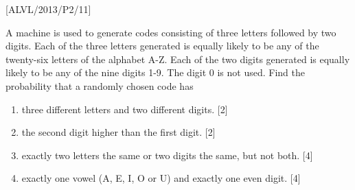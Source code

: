 \item {[}ALVL/2013/P2/11{]}

A machine is used to generate codes consisting of three letters followed
by two digits. Each of the three letters generated is equally likely
to be any of the twenty-six letters of the alphabet A-Z. Each of the
two digits generated is equally likely to be any of the nine digits
1-9. The digit 0 is not used. Find the probability that a randomly
chosen code has 
\begin{enumerate}
\item three different letters and two different digits. \hfill{}{[}2{]}
\item the second digit higher than the first digit. \hfill{}{[}2{]}
\item exactly two letters the same or two digits the same, but not both.
\hfill{}{[}4{]}
\item exactly one vowel (A, E, I, O or U) and exactly one even digit. \hfill{}
{[}4{]}
\end{enumerate}
